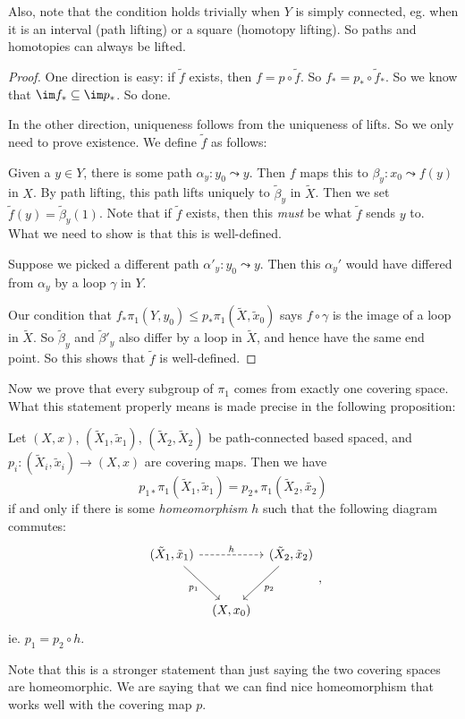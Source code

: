\documentclass[a4paper]{article}
\begin{document}
Also, note that the condition holds trivially when $Y$ is simply connected, eg. when it is an interval (path lifting) or a square (homotopy lifting). So paths and homotopies can always be lifted.

\begin{proof}
  One direction is easy: if $\tilde{f}$ exists, then $f = p \circ \tilde{f}$. So $f_* = p_* \circ \tilde{f}_*$. So we know that $\im f_* \subseteq \im p_*$. So done.

  In the other direction, uniqueness follows from the uniqueness of lifts. So we only need to prove existence. We define $\tilde{f}$ as follows:

  Given a $y \in Y$, there is some path $\alpha_y: y_0 \leadsto y$. Then $f$ maps this to $\beta_y: x_0 \leadsto f(y)$ in $X$. By path lifting, this path lifts uniquely to $\tilde{\beta}_y$ in $\tilde{X}$. Then we set $\tilde{f}(y) = \tilde{\beta}_y(1)$.  Note that if $\tilde{f}$ exists, then this \emph{must} be what $\tilde{f}$ sends $y$ to. What we need to show is that this is well-defined.

  Suppose we picked a different path $\alpha'_y: y_0 \leadsto y$. Then this $\alpha_y'$ would have differed from $\alpha_y$ by a loop $\gamma$ in $Y$.

  Our condition that $f_* \pi_1(Y, y_0) \leq p_*\pi_1(\tilde{X}, \tilde{x}_0)$ says $f\circ \gamma$ is the image of a loop in $\tilde{X}$. So $\tilde{\beta}_y$ and $\tilde{\beta}'_y$ also differ by a loop in $\tilde{X}$, and hence have the same end point. So this shows that $\tilde{f}$ is well-defined.
\end{proof}

Now we prove that every subgroup of $\pi_1$ comes from exactly one covering space. What this statement properly means is made precise in the following proposition:
\begin{prop}
  Let $(X, x)$, $(\tilde{X}_1, \tilde{x}_1)$, $(\tilde{X}_2, \tilde{X}_2)$ be path-connected based spaced, and $p_i: (\tilde{X}_i, \tilde{x}_i) \to (X, x)$ are covering maps. Then we have
  \[
    p_{1*}\pi_1(\tilde{X}_1, \tilde{x}_1) = p_{2*} \pi_1(\tilde{X}_2, \tilde{x_2})
  \]
  if and only if there is some \emph{homeomorphism} $h$ such that the following diagram commutes:
  \[
    \begin{tikzcd}[row sep=large, column sep=tiny]
      (\tilde{X}_1, \tilde{x}_1) \ar[rr, dashed, "h"] \ar[rd, "p_1"'] & & (\tilde{X}_2, \tilde{x}_2) \ar[ld, "p_2"]\\
      & (X, x_0)
    \end{tikzcd},
  \]
  ie. $p_1 = p_2 \circ h$.
\end{prop}
Note that this is a stronger statement than just saying the two covering spaces are homeomorphic. We are saying that we can find nice homeomorphism that works well with the covering map $p$.
\end{document}
